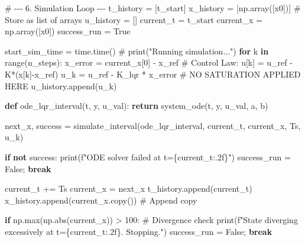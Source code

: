 \documentclass[
  letterpaper,
  DIV=11,
  numbers=noendperiod,
  oneside]{scrartcl}
\newenvironment{Shaded}{\begin{snugshade}}{\end{snugshade}}
\newcommand{\BuiltInTok}[1]{\textcolor[rgb]{0.00,0.23,0.31}{#1}}
\newcommand{\CommentTok}[1]{\textcolor[rgb]{0.37,0.37,0.37}{#1}}
\newcommand{\ControlFlowTok}[1]{\textcolor[rgb]{0.00,0.23,0.31}{\textbf{#1}}}
\newcommand{\DecValTok}[1]{\textcolor[rgb]{0.68,0.00,0.00}{#1}}
\newcommand{\KeywordTok}[1]{\textcolor[rgb]{0.00,0.23,0.31}{\textbf{#1}}}
\newcommand{\NormalTok}[1]{\textcolor[rgb]{0.00,0.23,0.31}{#1}}
\newcommand{\OperatorTok}[1]{\textcolor[rgb]{0.37,0.37,0.37}{#1}}
\newcommand{\SpecialCharTok}[1]{\textcolor[rgb]{0.37,0.37,0.37}{#1}}
\newcommand{\SpecialStringTok}[1]{\textcolor[rgb]{0.13,0.47,0.30}{#1}}
\newcommand{\VariableTok}[1]{\textcolor[rgb]{0.07,0.07,0.07}{#1}}
\begin{document}
\begin{Shaded}
\begin{Highlighting}[]
\CommentTok{\# {-}{-}{-} 6. Simulation Loop {-}{-}{-}}
\NormalTok{t\_history }\OperatorTok{=}\NormalTok{ [t\_start]}
\NormalTok{x\_history }\OperatorTok{=}\NormalTok{ [np.array([x0])] }\CommentTok{\# Store as list of arrays}
\NormalTok{u\_history }\OperatorTok{=}\NormalTok{ []}
\NormalTok{current\_t }\OperatorTok{=}\NormalTok{ t\_start}
\NormalTok{current\_x }\OperatorTok{=}\NormalTok{ np.array([x0])}
\NormalTok{success\_run }\OperatorTok{=} \VariableTok{True}

\NormalTok{start\_sim\_time }\OperatorTok{=}\NormalTok{ time.time()}
\CommentTok{\# print("Running simulation...")}
\ControlFlowTok{for}\NormalTok{ k }\KeywordTok{in} \BuiltInTok{range}\NormalTok{(n\_steps):}
\NormalTok{    x\_error }\OperatorTok{=}\NormalTok{ current\_x[}\DecValTok{0}\NormalTok{] }\OperatorTok{{-}}\NormalTok{ x\_ref}
    \CommentTok{\# Control Law: u[k] = u\_ref {-} K*(x[k]{-}x\_ref)}
\NormalTok{    u\_k }\OperatorTok{=}\NormalTok{ u\_ref }\OperatorTok{{-}}\NormalTok{ K\_lqr }\OperatorTok{*}\NormalTok{ x\_error}
    \CommentTok{\# NO SATURATION APPLIED HERE}
\NormalTok{    u\_history.append(u\_k)}

    \KeywordTok{def}\NormalTok{ ode\_lqr\_interval(t, y, u\_val):}
        \ControlFlowTok{return}\NormalTok{ system\_ode(t, y, u\_val, a, b)}

\NormalTok{    next\_x, success }\OperatorTok{=}\NormalTok{ simulate\_interval(ode\_lqr\_interval, current\_t, current\_x, Ts, u\_k)}

    \ControlFlowTok{if} \KeywordTok{not}\NormalTok{ success:}
        \BuiltInTok{print}\NormalTok{(}\SpecialStringTok{f"ODE solver failed at t=}\SpecialCharTok{\{}\NormalTok{current\_t}\SpecialCharTok{:.2f\}}\SpecialStringTok{"}\NormalTok{)}
\NormalTok{        success\_run }\OperatorTok{=} \VariableTok{False}\OperatorTok{;} \ControlFlowTok{break}

\NormalTok{    current\_t }\OperatorTok{+=}\NormalTok{ Ts}
\NormalTok{    current\_x }\OperatorTok{=}\NormalTok{ next\_x}
\NormalTok{    t\_history.append(current\_t)}
\NormalTok{    x\_history.append(current\_x.copy()) }\CommentTok{\# Append copy}

    \ControlFlowTok{if}\NormalTok{ np.}\BuiltInTok{max}\NormalTok{(np.}\BuiltInTok{abs}\NormalTok{(current\_x)) }\OperatorTok{\textgreater{}} \DecValTok{100}\NormalTok{: }\CommentTok{\# Divergence check}
        \BuiltInTok{print}\NormalTok{(}\SpecialStringTok{f"State diverging excessively at t=}\SpecialCharTok{\{}\NormalTok{current\_t}\SpecialCharTok{:.2f\}}\SpecialStringTok{. Stopping."}\NormalTok{)}
\NormalTok{        success\_run }\OperatorTok{=} \VariableTok{False}\OperatorTok{;} \ControlFlowTok{break}


\end{Highlighting}
\end{Shaded}
\end{document}
